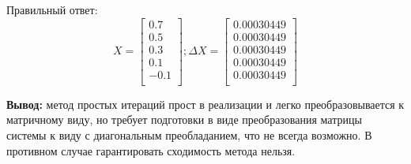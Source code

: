\documentclass[11pt]{article}
\begin{document}
    Правильный ответ:
    \[
        X=\left[
        \begin{array}{r}
             0.7 \\
             0.5 \\
             0.3 \\
             0.1 \\
            -0.1 \\
        \end{array}
        \right];
        \Delta X=\left[
        \begin{array}{r}
            0.00030449 \\
            0.00030449 \\
            0.00030449 \\
            0.00030449 \\
            0.00030449 \\
        \end{array}
        \right]
    \]

    \textbf{Вывод:}
    метод простых итераций прост в реализации и легко преобразовывается к матричному виду,
    но требует подготовки в виде преобразования матрицы системы к виду с диагональным преобладанием,
    что не всегда возможно.
    В противном случае гарантировать сходимость метода нельзя.
\end{document}
